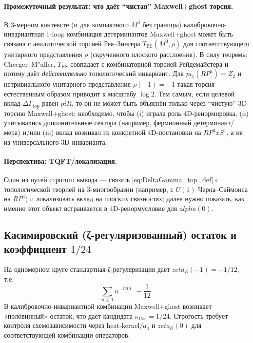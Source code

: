 \documentclass[12pt]{article}
\def\mathbb#1{#1}%
\def\alpha{alpha}%
\def\pi{pi}%
\def\times{x}%
\def\zeta{zeta}%
\begin{document}
\paragraph{Промежуточный результат: что даёт ``чистая'' Maxwell+ghost торсия.}
В 3-мерном контексте (и для компактного $M^3$ без границы) калибровочно-инвариантная 1-loop комбинация детерминантов Maxwell+ghost может быть связана с аналитической торсией Рея--Зингера $T_{\mathrm{RS}}(M^3,\rho)$ для соответствующего унитарного представления $\rho$ (скрученного плоского расслоения).
В силу теоремы Cheeger--M{"u}ller, $T_{\mathrm{RS}}$ совпадает с комбинаторной торсией Рейдемайстера и потому даёт \emph{действительно} топологический инвариант.\cite{cheeger,muller}
Для $\pi_1(\mathbb{RP}^3)=\mathbb{Z}_2$ и нетривиального унитарного представления $\rho(-1)=-1$ такая торсия естественным образом приводит к масштабу $\log 2$.
Тем самым, если целевой вклад $\Delta\Gamma_{\mathrm{top}}$ равен $\pi R$, то он не может быть объяснён только через ``чистую'' 3D-торсию Maxwell+ghost: необходимо, чтобы (i) играла роль 4D-ренормировка, (ii) учитывались дополнительные сектора (например, фермионный детерминант/мера) и/или (iii) вклад возникал из конкретной 4D-постановки на $\mathbb{RP}^3\times S^1$, а не из универсального 3D-инварианта.

\paragraph{Перспектива: TQFT/локализация.}
Один из путей строгого вывода --- связать \eqref{eq:DeltaGamma_top_def} с топологической теорией на 3-многообразии (например, с $U(1)$ Черна--Саймонса на $\mathbb{RP}^3$) и локализовать вклад на плоских связностях; далее нужно показать, как именно этот объект встраивается в 4D-ренормусловие для $\alpha(0)$.\cite{witten_cs}

\subsection{Касимировский (ζ-регуляризованный) остаток и коэффициент $1/24$}
На одномерном круге стандартная ζ-регуляризация даёт $\zeta_R(-1)=-1/12$, т.е.
\begin{equation}
  \sum_{n\ge 1} n
  \;\overset{\zeta}{=}\;
  -\frac{1}{12}.
\end{equation}
В калибровочно-инвариантной комбинации Maxwell+ghost возникает «половинный» остаток, что даёт кандидата $\kappa_{\mathrm{Cas}}=1/24$.
Строгость требует контроля схемозависимости через heat-kernel/$a_4$ и $\zeta_{\mathcal{O}}(0)$ для соответствующей комбинации операторов.\cite{gilkey}
\end{document}
